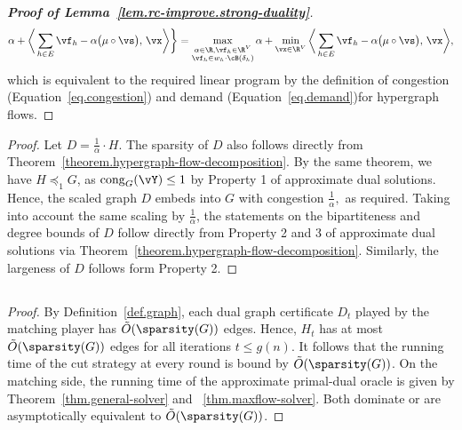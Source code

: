 \documentclass[letterpaper]{article}
\renewcommand{\cong}{\operatorname{cong}}
\begin{document}
\begin{proof}[{\bf Proof of Lemma~\ref{lem.rc-improve.strong-duality}}]
\begin{equation*}
  \alpha + \bigg\langle \sum_{h \in E} \vf_h - \alpha \big( \mu \circ \vs \big), \, \vx \bigg\rangle
\bigg\}
= \max_{\substack{\alpha \in \R, \vf_h \in \R^V \\ \vf_h \in w_h\cdot \cB(\delta_h)}} \alpha
  + \min_{\vx \in \R^V} \bigg\langle \sum_{h \in E} \vf_h - \alpha \big( \mu \circ \vs \big), \, \vx \bigg\rangle,
\end{equation*}
which is equivalent to the required linear program by the definition of congestion (Equation~\ref{eq.congestion}) and demand (Equation~\ref{eq.demand})for hypergraph flows.
\end{proof}

\dualgraphcertificate*
\begin{proof}
Let $D = \frac{1}{\alpha}\cdot H.$ The sparsity of $D$ also follows directly from Theorem~\ref{theorem.hypergraph-flow-decomposition}. By the same theorem, we have $H \preceq_{1} G$, as $\cong_G(\vY)\leq 1$ by Property 1 of approximate dual solutions. Hence, the scaled graph $D$ embeds into $G$ with congestion $\frac{1}{\alpha},$ as required.
Taking into account the same scaling by $\frac{1}{\alpha}$,
the statements on the bipartiteness and degree bounds of $D$ follow directly from Property 2 and 3 of approximate dual solutions via Theorem~\ref{theorem.hypergraph-flow-decomposition}. Similarly, the largeness of $D$ follows form Property 2.
\end{proof}
 
\subsection{}
\label{sec.appendix.omitted.alg-cm}
\genpoly*

\polycut*

\begin{proof}
By Definition~\ref{def.graph}, each dual graph certificate $D_t$ played by the matching player has $\tilde{O}(\sparsity(G))$ edges. Hence, $H_t$ has at most $\tilde{O}(\sparsity(G))$ edges for all iterations $t \leq g(n).$ It follows that the running time of the cut strategy at every round is bound by $\tilde{O}(\sparsity(G))$. On the matching side, the running time of the approximate primal-dual oracle is given by Theorem~\ref{thm.general-solver} and ~\ref{thm.maxflow-solver}. Both dominate or are asymptotically equivalent to $\tilde{O}(\sparsity(G))$.
\end{proof}
\end{document}
